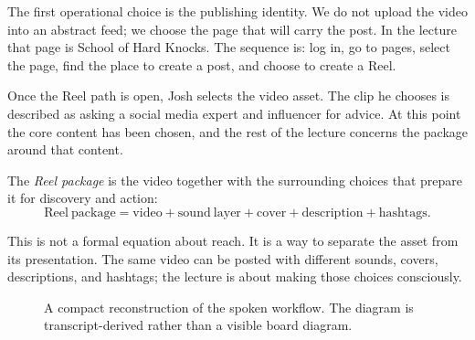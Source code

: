 The first operational choice is the publishing identity. We do not upload the video into an abstract feed; we choose the page that will carry the post. In the lecture that page is School of Hard Knocks. The sequence is: log in, go to pages, select the page, find the place to create a post, and choose to create a Reel.

Once the Reel path is open, Josh selects the video asset. The clip he chooses is described as asking a social media expert and influencer for advice. At this point the core content has been chosen, and the rest of the lecture concerns the package around that content.

\begin{definition}
The \emph{Reel package} is the video together with the surrounding choices that prepare it for discovery and action:
\begin{equation}
\mathrm{Reel\ package}
=
\mathrm{video}
+
\mathrm{sound\ layer}
+
\mathrm{cover}
+
\mathrm{description}
+
\mathrm{hashtags}.
\end{equation}
\end{definition}

This is not a formal equation about reach. It is a way to separate the asset from its presentation. The same video can be posted with different sounds, covers, descriptions, and hashtags; the lecture is about making those choices consciously.

\begin{figure}
\centering
{}
\caption{A compact reconstruction of the spoken workflow. The diagram is transcript-derived rather than a visible board diagram.}
\end{figure}

